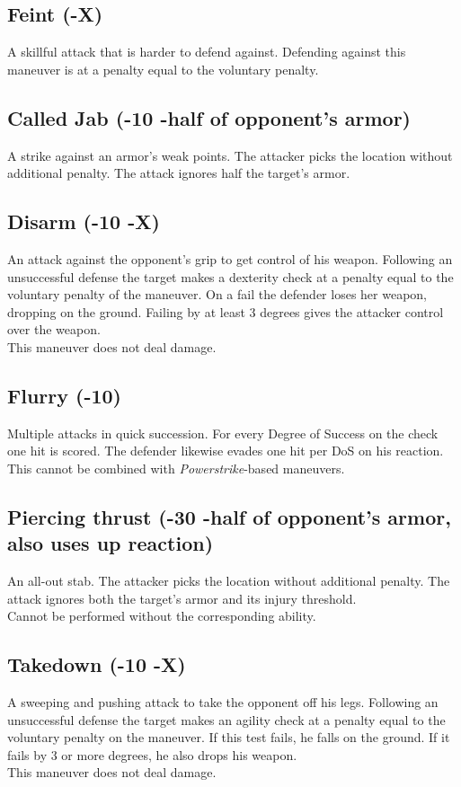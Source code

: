 \subsection*{Feint (-X)}
A skillful attack that is harder to defend against. Defending against this maneuver is at a penalty equal to the voluntary penalty.
\subsection*{Called Jab (-10 -half of opponent’s armor)}
A strike against an armor’s weak points. The attacker picks the location without additional penalty. The attack ignores half the target’s armor.
\subsection*{Disarm (-10 -X)}
An attack against the opponent’s grip to get control of his weapon.
Following an unsuccessful defense the target makes a dexterity check at a penalty equal to the voluntary penalty of the maneuver.
On a fail the defender loses her weapon, dropping on the ground.
Failing by at least 3 degrees gives the attacker control over the weapon.\\
This maneuver does not deal damage.
\subsection*{Flurry (-10)}
Multiple attacks in quick succession.
For every Degree of Success on the check one hit is scored.
The defender likewise evades one hit per DoS on his reaction.
\\%
This cannot be combined with \emph{Powerstrike}-based maneuvers.
\subsection*{Piercing thrust (-30 -half of opponent’s armor, also uses up reaction)}
An all-out stab. The attacker picks the location without additional penalty. The attack ignores both the target's armor and its injury threshold.\\
Cannot be performed without the corresponding ability.
\subsection*{Takedown (-10 -X)}
A sweeping and pushing attack to take the opponent off his legs.
Following an unsuccessful defense the target makes
	an agility check
	at a penalty equal to the voluntary penalty on the maneuver.
If this test fails, he falls on the ground.
If it fails by 3 or more degrees, he also drops his weapon.
\\%
This maneuver does not deal damage.

